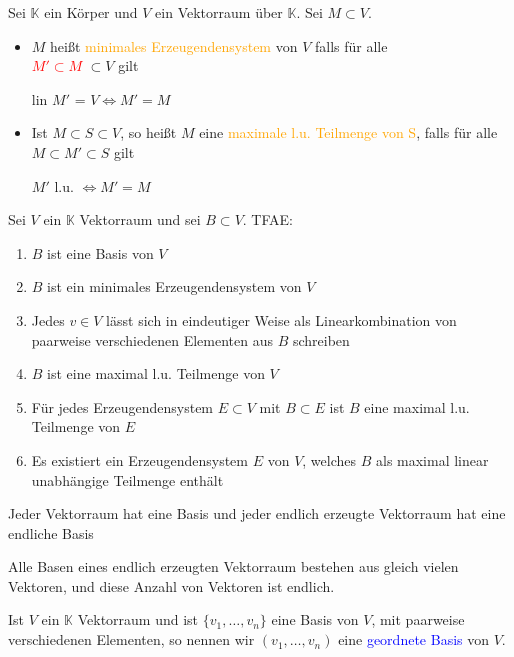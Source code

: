 \begin{definition}
Sei $\mathbb{K}$ ein Körper und $V$ ein Vektorraum über $\mathbb{K}$. Sei $M \subset V$.
\begin{itemize}
    \item $M$ heißt \textcolor{orange}{minimales Erzeugendensystem} von $V$ falls für alle\\
    \textcolor{red}{$M' \subset M$} $\subset V$ gilt
    \begin{center}
        lin $M'$ = $V \Leftrightarrow M' = M$
    \end{center}
    \item Ist $M \subset S \subset V$, so heißt $M$ eine \textcolor{orange}{maximale l.u. Teilmenge von S}, falls für alle $M \subset M' \subset S$ gilt
    \begin{center}
        $M'$ l.u. $\Leftrightarrow M' = M$
    \end{center}
\end{itemize}
\end{definition}
\begin{theorem}
Sei $V$ ein $\mathbb{K}$ Vektorraum und sei $B \subset V$. TFAE:
\begin{enumerate}
    \item $B$ ist eine Basis von $V$
    \item $B$ ist ein minimales Erzeugendensystem von $V$
    \item Jedes $v \in V$ lässt sich in eindeutiger Weise als Linearkombination von paarweise verschiedenen Elementen aus $B$ schreiben
    \item $B$ ist eine maximal l.u. Teilmenge von $V$
    \item Für jedes Erzeugendensystem $E \subset V$ mit $B \subset E$ ist $B$ eine maximal l.u. Teilmenge von $E$
    \item Es existiert ein Erzeugendensystem $E$ von $V$, welches $B$ als maximal linear unabhängige Teilmenge enthält
\end{enumerate}
\end{theorem}
\begin{theorem}
Jeder Vektorraum hat eine Basis und jeder endlich erzeugte Vektorraum hat eine endliche Basis
\end{theorem}
\begin{theorem}
Alle Basen eines endlich erzeugten Vektorraum bestehen aus gleich vielen Vektoren, und diese Anzahl von Vektoren ist endlich.
\end{theorem}
\begin{definition}
Ist $V$ ein $\mathbb{K}$ Vektorraum und ist $\{v_1, \dots, v_n\}$ eine Basis von $V$, mit paarweise verschiedenen Elementen, so nennen wir $(v_1, \dots, v_n)$ eine \textcolor{blue}{geordnete Basis} von $V$.
\end{definition}
